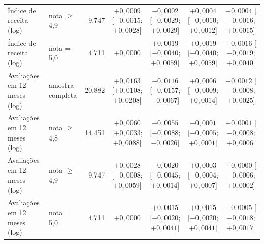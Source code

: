 \begin{table}[htb]
{\begin{tabular}{l|l|r|c|c|c|c}
Índice de receita (log) & nota $\geq$ 4,9 & 9.747 & $+0{,}0009$ [$-0{,}0015$; $+0{,}0028$] & $-0{,}0002$ [$-0{,}0029$; $+0{,}0029$] & $+0{,}0004$ [$-0{,}0010$; $+0{,}0012$] & $+0{,}0004$ [$-0{,}0016$; $+0{,}0015$]\\
Índice de receita (log) & nota = 5,0 & 4.711 & $+0{,}0000$ & $+0{,}0019$ [$-0{,}0040$; $+0{,}0059$] & $+0{,}0019$ [$-0{,}0040$; $+0{,}0059$] & $+0{,}0016$ [$-0{,}0019$; $+0{,}0040$]\\
Avaliações em 12 meses (log) & amostra completa & 20.882 & $+0{,}0163$ [$+0{,}0108$; $+0{,}0208$] & $-0{,}0116$ [$-0{,}0157$; $-0{,}0067$] & $+0{,}0006$ [$-0{,}0009$; $+0{,}0014$] & $+0{,}0012$ [$-0{,}0008$; $+0{,}0025$]\\
Avaliações em 12 meses (log) & nota $\geq$ 4,8 & 14.451 & $+0{,}0060$ [$+0{,}0033$; $+0{,}0088$] & $-0{,}0055$ [$-0{,}0088$; $-0{,}0026$] & $-0{,}0001$ [$-0{,}0005$; $+0{,}0001$] & $+0{,}0001$ [$-0{,}0008$; $+0{,}0006$]\\
Avaliações em 12 meses (log) & nota $\geq$ 4,9 & 9.747 & $+0{,}0028$ [$-0{,}0008$; $+0{,}0059$] & $-0{,}0020$ [$-0{,}0045$; $+0{,}0014$] & $+0{,}0003$ [$-0{,}0004$; $+0{,}0007$] & $+0{,}0000$ [$-0{,}0006$; $+0{,}0002$]\\
Avaliações em 12 meses (log) & nota = 5,0 & 4.711 & $+0{,}0000$ & $+0{,}0015$ [$-0{,}0020$; $+0{,}0041$] & $+0{,}0015$ [$-0{,}0020$; $+0{,}0041$] & $+0{,}0005$ [$-0{,}0018$; $+0{,}0017$]\\
\hline
\end{tabular}}
\label{tab:ganhocompleto}
\end{table}
